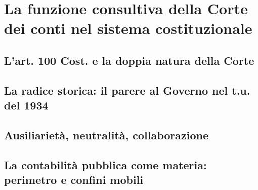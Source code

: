 

\chapter{La funzione consultiva della Corte dei conti nel sistema costituzionale}
\label{cap:cap1}

\section{L'art. 100 Cost. e la doppia natura della Corte}
\label{sez:cap1:art100}


\section{La radice storica: il parere al Governo nel t.u. del 1934}
\label{sez:cap1:storia}


\section{Ausiliarietà, neutralità, collaborazione}
\label{sez:cap1:fondamento}


\section{La contabilità pubblica come materia: perimetro e confini mobili}
\label{sez:cap1:materia}



